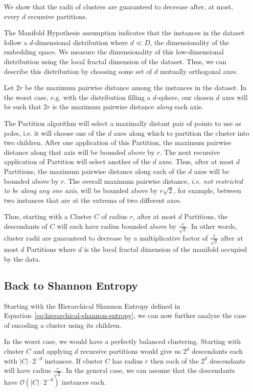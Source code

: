 We show that the radii of clusters are guaranteed to decrease after, at most, every $d$ recursive partitions.

The Manifold Hypothesis assumption indicates that the instances in the dataset follow a $d$-dimensional distribution where $d \ll D$, the dimensionality of the embedding space.
We measure the dimensionality of this low-dimensional distribution using the local fractal dimension of the dataset.
Thus, we can describe this distribution by choosing some set of $d$ mutually orthogonal axes.

Let $2r$ be the maximum pairwise distance among the instances in the dataset.
In the worst case, e.g. with the distribution filling a $d$-sphere, our chosen $d$ axes will be such that $2r$ is the maximum pairwise distance \textit{along} each axis.

The Partition algorithm will select a maximally distant pair of points to use as poles, i.e. it will choose one of the $d$ axes along which to partition the cluster into two children.
After one application of this Partition, the maximum pairwise distance along that axis will be bounded above by $r$.
The next recursive application of Partition will select another of the $d$ axes.
Thus, after at most $d$ Partitions, the maximum pairwise distance along each of the $d$ axes will be bounded above by $r$.
The overall maximum pairwise distance, \textit{i.e. not restricted to be along any one axis}, will be bounded above by $r \sqrt{2}$, for example, between two instances that are at the extrema of two different axes.

Thus, starting with a Cluster $C$ of radius $r$, after at most $d$ Partitions, the descendants of $C$ will each have radius bounded above by $\frac{r}{\sqrt{2}}$.
In other words, cluster radii are guaranteed to decrease by a multiplicative factor of $\frac{1}{\sqrt{2}}$ after at most $d$ Partitions where $d$ is the local fractal dimension of the manifold occupied by the data.


\subsection{Back to Shannon Entropy}
\label{subsec:methods:back-to-shannon-entropy}

Starting with the Hierarchical Shannon Entropy defined in Equation~\ref{eq:hierarchical-shannon-entropy}, we can now further analyze the case of encoding a cluster using its children.

In the worst case, we would have a perfectly balanced clustering.
Starting with cluster $C$ and applying $d$ recursive partitions would give us $2^d$ descendants each with $|C| \cdot 2^{-d}$ instances.
If cluster $C$ has radius $r$ then each of the $2^d$ descendants will have radius $\frac{r}{\sqrt{2}}$.
In the general case, we can assume that the descendants have $\mathcal{O}(|C| \cdot 2^{-d})$ instances each.

